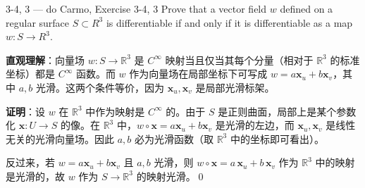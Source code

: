 \begin{exercise}{3-4, 3 — do Carmo, Exercise 3-4, 3}
Prove that a vector field $w$ defined on a regular surface $S \subset R^3$ is differentiable if and only if it is differentiable as a map $w \colon S \to R^3$.
\end{exercise}
\begin{solution}
\textbf{直观理解}：向量场 $w\colon S\to\mathbb{R}^3$ 是 $C^\infty$ 映射当且仅当其每个分量（相对于 $\mathbb{R}^3$ 的标准坐标）都是 $C^\infty$ 函数。而 $w$ 作为向量场在局部坐标下可写成 $w = a\mathbf{x}_u + b\mathbf{x}_v$，其中 $a,b$ 光滑。这两个条件等价，因为 $\mathbf{x}_u,\mathbf{x}_v$ 是局部光滑标架。

\textbf{证明}：设 $w$ 在 $\mathbb{R}^3$ 中作为映射是 $C^\infty$ 的。由于 $S$ 是正则曲面，局部上是某个参数化 $\mathbf{x}\colon U\to S$ 的像。在 $\mathbb{R}^3$ 中，$w\circ\mathbf{x} = a\mathbf{x}_u + b\mathbf{x}_v$ 是光滑的左边，而 $\mathbf{x}_u,\mathbf{x}_v$ 是线性无关的光滑向量场。因此 $a,b$ 必为光滑函数（取 $\mathbb{R}^3$ 中的坐标即可看出）。

反过来，若 $w = a\mathbf{x}_u + b\mathbf{x}_v$ 且 $a,b$ 光滑，则 $w\circ\mathbf{x} = a\,\mathbf{x}_u + b\,\mathbf{x}_v$ 作为 $\mathbb{R}^3$ 中的映射是光滑的，故 $w$ 作为 $S\to\mathbb{R}^3$ 的映射光滑。\qed
\end{solution}

